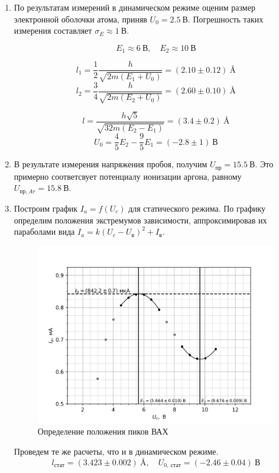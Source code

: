 \documentclass[14pt, a4paper]{report}
\begin{document}
\begin{enumerate}

\item По результатам измерений в динамическом режиме оценим размер электронной оболочки атома, приняв $U_0=2.5\ В$. Погрешность таких измерения составляет $\sigma_E\approx1\ В$.

\[E_1\approx 6\ В,\quad E_2\approx 10\ В\]

\[l_1=\frac{1}{2}\frac{h}{\sqrt{2m(E_1+U_0)}}=(2.10\pm0.12)\ \si{\angstrom}\]
\[l_2=\frac{3}{4}\frac{h}{\sqrt{2m(E_2+U_0)}}=(2.60\pm0.10)\ \si{\angstrom}\]

\[l=\frac{h\sqrt{5}}{\sqrt{32m(E_2-E_1)}}=(3.4\pm0.2)\ \si{\angstrom}\]
\[U_0=\frac{4}{5}E_2-\frac{9}{5}E_1=(-2.8\pm1)\ В\]

\item В результате измерения напряжения пробоя, получим $U_{пр}=15.5\ В$. Это примерно соответсвует потенциалу ионизации аргона, равному $U_{пр, Ar}=15.8\ В$.

\item Построим график $I_a=f(U_c)$ для статического режима. По графику определим положения экстремумов зависимости, аппроксимировав их параболами вида $I_a=k(U_c-U_в)^2+I_в$.

\begin{figure}[H]
\centering
\includegraphics[scale=0.8]{../images/513-5}
\caption{Определение положения пиков ВАХ}
\end{figure}

Проведем те же расчеты, что и в динамическом режиме.
\[l_{стат}=(3.423\pm0.002)\ \si{\angstrom},\quad U_{0,\ стат}=(-2.46\pm0.04)\ В\]


\end{enumerate}
\end{document}
